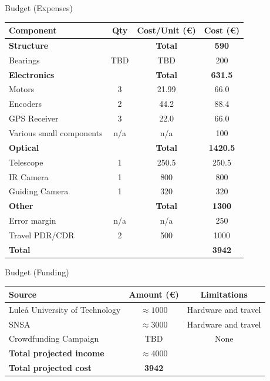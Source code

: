 \documentclass[11pt, aspectratio=169]{beamer}
\begin{document}
\begin{frame}{Budget (Expenses)}
    \centering
    \footnotesize
    \begin{tabular}{|l|c|c|c|} 
        \hline
        Component & Qty & Cost/Unit (\euro) & Cost (\euro)  \\ 
        \hline
        \rowcolor{Gray}
        \textbf{Structure} &  & \textbf{Total} & \textbf{590}  \\
        Bearings & TBD & TBD & 200 \\ 
        \hline
        \rowcolor{Gray}
        \textbf{Electronics} &  & \textbf{Total} & \textbf{631.5}  \\
        Motors & 3 & 21.99 & 66.0  \\
        Encoders & 2 & 44.2 & 88.4  \\
        GPS Receiver & 3 & 22.0 & 66.0  \\
        Various small components & n/a & n/a & 100  \\
        \hline
        
        \rowcolor{Gray}
        \textbf{Optical} &  & \textbf{Total} & \textbf{1420.5}  \\
        Telescope & 1 & 250.5 & 250.5  \\
        IR Camera & 1 & 800 & 800  \\
        Guiding Camera & 1 & 320 & 320  \\
        \hline
        
        \rowcolor{Gray}
        \textbf{Other} &  & \textbf{Total} & \textbf{1300}  \\
        Error margin & n/a & n/a & 250  \\
        Travel PDR/CDR & 2 & 500 & 1000 \\
        \hline
        \textbf{Total} &  &  & \textbf{3942}  \\
        \hline
    \end{tabular}
\end{frame}

\begin{frame}{Budget (Funding)}
    \centering
    \small
    \begin{tabular}{|l|c|c|} 
        \hline
        Source & Amount (\euro) & Limitations   \\ 
        \hline
        Luleå University of Technology & $\approx1000$ & Hardware and travel \\
        SNSA & $\approx3000$ & Hardware and travel \\
        Crowdfunding Campaign & TBD & None \\
        \hline
        \textbf{Total projected income} & \textbf{$\approx4000$} & \\
        \hline
        \bf{Total projected cost} & \bf{3942} & \\
        \hline
    \end{tabular}
\end{frame}
    
\end{document}

